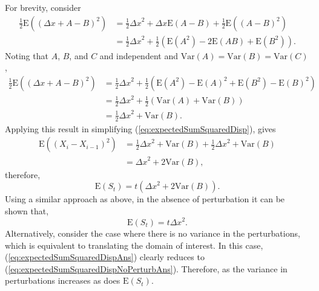 \documentclass[11pt,a4paper]{article}
\begin{document}
			For brevity, consider
			\begin{align*}
			\frac{1}{2} \mathrm{E} \left(\left(\Delta x + A - B \right)^2 \right) &= \frac{1}{2} {\Delta x}^2 + \Delta x \mathrm{E} \left (A - B \right) + \frac{1}{2} \mathrm {E} \left( \left(A - B \right)^2 \right) \\
			&= \frac{1}{2} {\Delta x}^2 + \frac{1}{2} \left(\mathrm{E} \left(A^2 \right) - 2 \mathrm{E} \left(AB \right) + \mathrm{E} \left(B^2 \right) \right).
			\end{align*}
			Noting that $A$, $B$, and $C$ and independent and $\mathrm{Var} \left(A \right) = \mathrm{Var} \left(B \right) = \mathrm{Var} \left(C \right)$,
			\begin{align*}
			\frac{1}{2} \mathrm{E} \left(\left(\Delta x + A - B \right)^2 \right) &= \frac{1}{2} {\Delta x}^2 + \frac{1}{2} \left(\mathrm{E} \left(A^2 \right) - \mathrm{E} \left(A \right)^2 + \mathrm{E} \left(B^2 \right) - \mathrm{E} \left(B \right)^2 \right) \\
			&= \frac{1}{2} {\Delta x}^2 + \frac{1}{2} \left(\mathrm{Var} \left(A \right) + \mathrm{Var} \left(B \right) \right) \\
			&= \frac{1}{2} {\Delta x}^2 + \mathrm{Var} \left(B \right).
			\end{align*}
			Applying this result in simplifying (\ref{eq:expectedSumSquaredDisp}), gives
			\begin{align*}
				\mathrm{E} \left( \left(X_i - X_{i-1} \right)^2 \right) &= \frac{1}{2} {\Delta x}^2 + \mathrm{Var} \left(B \right) + \frac{1}{2} {\Delta x}^2 + \mathrm{Var} \left(B \right) \\
				&= {\Delta x}^2 + 2 \mathrm{Var} \left(B \right),
			\end{align*}
			therefore,
			\begin{equation}
				\label{eq:expectedSumSquaredDispAns}
				\mathrm{E} \left(S_t \right) = t \left({\Delta x}^2 + 2 \mathrm{Var} \left(B \right) \right).
			\end{equation}
			Using a similar approach as above, in the absence of perturbation it can be shown that, 
			\begin{equation}
				\label{eq:expectedSumSquaredDispNoPerturbAns}
				\mathrm{E} \left(S_t \right) = t {\Delta x}^2.
			\end{equation}
			Alternatively, consider the case where there is no variance in the perturbations, which is equivalent to translating the domain of interest. In this case, (\ref{eq:expectedSumSquaredDispAns}) clearly reduces to (\ref{eq:expectedSumSquaredDispNoPerturbAns}). Therefore, as the variance in perturbations increases as does $\mathrm{E} \left(S_t \right)$.
\end{document}
